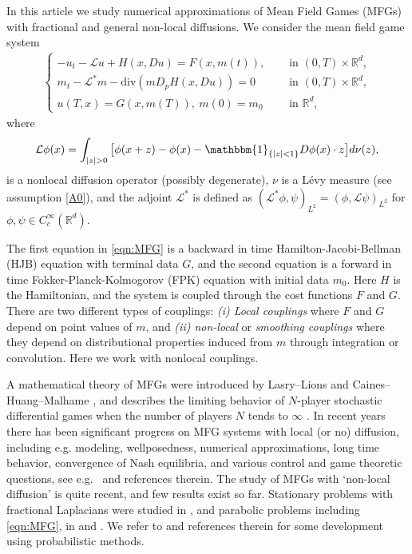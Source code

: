 \documentclass[a4paper,  twoside, 10pt, leqno]{amsart}
\newcommand{\R}{\mathbb{R}}
\newcommand{\rd}{\mathbb{R}^d}
\theoremstyle{remark}
\theoremstyle{definition}
\begin{document}
 In this article we study numerical approximations of Mean Field Games (MFGs) with fractional and general non-local diffusions. We consider the mean field game system
\begin{align}
 \begin{cases}
        -u_t - \mathcal{L} u + H(x,Du) = F (x, m(t)), \quad &\text{ in } (0,T)\times\R^d, \\
        m_t - \mathcal{L}^*m - \text{div} (m D_p H(x,Du)) = 0 \quad &\text{ in } (0,T)\times\R^d, \\
        u (T,x) = G(x,m(T)), \ m(0) = m_0 \quad &\text{ in } \R^d,
    \end{cases}
    \label{eqn:MFG}
\end{align}
where
\begin{align}
    \mathcal{L} \phi (x)= \int_{|z|>0} \big[ \phi (x+z) - \phi (x) - \mathbbm{1}_{\{|z|<1\}} 
    D \phi (x) \cdot z   \big] d\nu(z),
    \label{levy_operator}
\end{align}
is a nonlocal diffusion operator (possibly degenerate), $\nu$ is a L\'evy measure (see assumption \ref{A0}), and the adjoint $\mathcal{L}^{*}$ is defined as 
$ ( \mathcal{L}^{*} \phi, \psi )_{L^{2}} = 
( \phi, \mathcal{L} \psi )_{L^2 }$ for 
$\phi,\psi \in C_{c}^{\infty} ( \rd )$. 





The first equation in \eqref{eqn:MFG} is a backward in time Hamilton-Jacobi-Bellman (HJB) equation with terminal data $G$, 
and the second equation is a forward in time Fokker-Planck-Kolmogorov (FPK) equation with initial data $m_0$. 
Here $H$ is the %
Hamiltonian, and 
the system is coupled through the cost functions $F$ and  $G$.  
There are two different types of couplings: \textit{(i) Local couplings} where $F$ and $G$ depend on point values of $m$, 
and \textit{(ii) non-local} or {\it smoothing couplings} where they depend on distributional properties induced from $m$ through integration or convolution. 
Here we work with nonlocal couplings. 

A mathematical theory of MFGs were
introduced by Lasry--Lions
\cite{MR2295621} and Caines--Huang--Malhame
\cite{MR2346927}, and describes the limiting behavior of $N$-player stochastic differential games when the number of players $N$ tends to $\infty$ \cite{cardaliaguet2015master}. 
In recent years there has been significant progress on MFG systems with local (or no) diffusion,  including e.g. modeling, wellposedness, numerical approximations, long time behavior, convergence of Nash equilibria, and various control and game theoretic questions, see e.g.~\cite{ACDPS:Note,CD:Books,cardaliaguet2015master,BFY:Book,GPV:Book,GLL03} and references therein. 
The study of  MFGs  with `non-local diffusion' is quite recent, and few results exist so far. Stationary problems with fractional Laplacians were studied in \cite{cesaroni2017stationary}, and parabolic problems including \eqref{eqn:MFG}, in \cite{cirant2019existence} and  \cite{ersland2020classical}. 
We refer to \cite{MR3580196} and references therein for some development using probabilistic methods.
\end{document}
